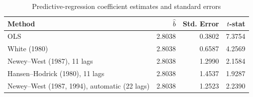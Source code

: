 \begin{table}[htbp]
  \centering
  \caption{Predictive-regression coefficient estimates and standard errors}
  \label{tab:q2b}
  \begin{tabular}{lrrr}
    \toprule
    Method & $\hat{b}$ & Std. Error & $t$-stat \\
    \midrule
    OLS & 2.8038 & 0.3802 & 7.3754 \\
    White (1980) & 2.8038 & 0.6587 & 4.2569 \\
    Newey--West (1987), 11 lags & 2.8038 & 1.2990 & 2.1584 \\
    Hansen--Hodrick (1980), 11 lags & 2.8038 & 1.4537 & 1.9287 \\
    Newey--West (1987, 1994), automatic (22 lags) & 2.8038 & 1.2523 & 2.2390 \\
    \bottomrule
  \end{tabular}
\end{table}
